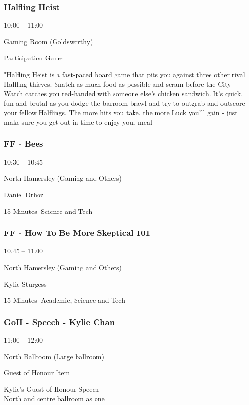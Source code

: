 \documentclass{scrreprt}
\begin{document}
\begin{multicols}{2}
\subsubsection*{Halfling Heist}\begin{description}
\setlength{\itemsep}{0pt}
\setlength{\parsep}{0pt}
\setlength{\parskip}{0pt}
\item[Time:]{10:00 -- 11:00}
\item[Venue:]{Gaming Room (Goldsworthy)}
\item[Tags:]{Participation Game}\end{description}
"Halfling Heist is a fast-paced board game that pits you against three other rival Halfling thieves. Snatch as much food as possible and scram before the City Watch catches you red-handed with someone else’s chicken sandwich. It’s quick, fun and brutal as you dodge the barroom brawl and try to outgrab and outscore your fellow Halflings. The more hits you take, the more Luck you’ll gain - just make sure you get out in time to enjoy your meal!
\subsubsection*{FF - Bees}\begin{description}
\setlength{\itemsep}{0pt}
\setlength{\parsep}{0pt}
\setlength{\parskip}{0pt}
\item[Time:]{10:30 -- 10:45}
\item[Venue:]{North Hamersley (Gaming and Others)}
\item[People:]{Daniel Drhoz}
\item[Tags:]{15 Minutes, Science and Tech}\end{description}

\subsubsection*{FF - How To Be More Skeptical 101}\begin{description}
\setlength{\itemsep}{0pt}
\setlength{\parsep}{0pt}
\setlength{\parskip}{0pt}
\item[Time:]{10:45 -- 11:00}
\item[Venue:]{North Hamersley (Gaming and Others)}
\item[People:]{Kylie Sturgess}
\item[Tags:]{15 Minutes, Academic, Science and Tech}\end{description}

\subsubsection*{GoH - Speech - Kylie Chan}\begin{description}
\setlength{\itemsep}{0pt}
\setlength{\parsep}{0pt}
\setlength{\parskip}{0pt}
\item[Time:]{11:00 -- 12:00}
\item[Venue:]{North Ballroom (Large ballroom)}
\item[Tags:]{Guest of Honour Item}\end{description}
Kylie's Guest of Honour Speech\\North and centre ballroom as one

\end{multicols}
\end{document}
